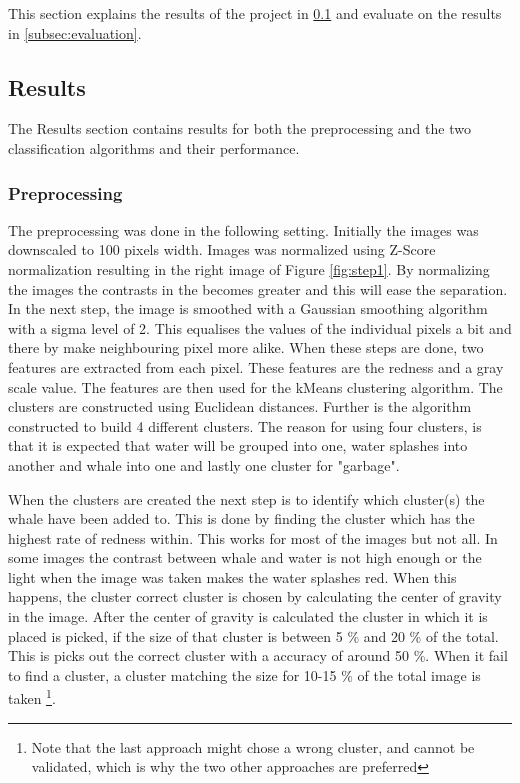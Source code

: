 This section explains the results of the project in \ref{subsec:results} and evaluate on the results in \ref{subsec:evaluation}.

\subsection{Results}
\label{subsec:results}
The Results section contains results for both the preprocessing and the two classification algorithms and their performance.


\subsubsection{Preprocessing}
The preprocessing was done in the following setting.
Initially the images was downscaled to 100 pixels width.
Images was normalized using Z-Score normalization resulting in the right image of Figure \ref{fig:step1}. By normalizing the images the contrasts in the becomes greater and this will ease the separation.
In the next step, the image is smoothed with a Gaussian smoothing algorithm with a sigma level of 2. This equalises the values of the individual pixels a bit and there by make neighbouring pixel more alike.
When these steps are done, two features are extracted from each pixel.
These features are the redness and a gray scale value.
The features are then used for the kMeans clustering algorithm.
The clusters are constructed using Euclidean distances. Further is the algorithm constructed to build 4 different clusters.
The reason for using four clusters, is that it is expected that water will be grouped into one, water splashes into another and whale into one and lastly one cluster for "garbage". 

When the clusters are created the next step  is to identify which cluster(s) the whale have been added to.
This is done by finding the cluster which has the highest rate of redness within. This works for most of the images but not all. In some images the contrast between whale and water is not high enough or the light when the image was taken makes the water splashes red. When this happens, the cluster correct cluster is chosen by calculating the center of gravity in the image. After the center of gravity is calculated the cluster in which it is placed is picked, if the size of that cluster is between 5 \% and 20 \% of the total. This is picks out the correct cluster with a accuracy of around 50 \%.
When it fail to find a cluster, a cluster matching the size for 10-15 \% of the total image is taken \footnote{Note that the last approach might chose a wrong cluster, and cannot be validated, which is why the two other approaches are preferred}. 

